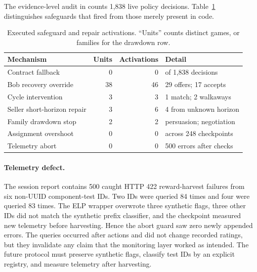 The evidence-level audit in
 counts 1,838 live policy
decisions. Table~\ref{tab:v33-activations} distinguishes safeguards that fired
from those merely present in code.
\begin{table}[t]
  \caption{Executed safeguard and repair activations. ``Units'' counts distinct
  games, or families for the drawdown row.}
  \label{tab:v33-activations}
  \centering\scriptsize
  \begin{tabular}{lrrl}
    \toprule
    Mechanism & Units & Activations & Detail \\
    \midrule
    Contract fallback & 0 & 0 & of 1,838 decisions \\
    Bob recovery override & 38 & 46 & 29 offers; 17 accepts \\
    Cycle intervention & 3 & 3 & 1 match; 2 walkaways \\
    Seller short-horizon repair & 3 & 6 & 4 from unknown horizon \\
    Family drawdown stop & 2 & 2 & persuasion; negotiation \\
    Assignment overshoot & 0 & 0 & across 248 checkpoints \\
    Telemetry abort & 0 & 0 & 500 errors after checks \\
    \bottomrule
  \end{tabular}
\end{table}

\paragraph{Telemetry defect.}
The session report contains 500 caught HTTP 422 reward-harvest failures from six
non-UUID component-test IDs. Two IDs were queried 84 times and four were queried
83 times. The ELP wrapper overwrote three synthetic flags, three other IDs did
not match the synthetic prefix classifier, and the checkpoint measured new
telemetry before harvesting. Hence the abort guard saw zero newly appended
errors. The queries occurred after actions and did not change recorded ratings,
but they invalidate any claim that the monitoring layer worked as intended.
The future protocol must preserve synthetic flags, classify test IDs by an
explicit registry, and measure telemetry after harvesting.


